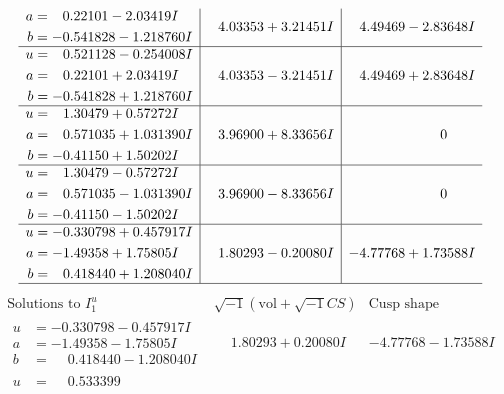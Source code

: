 \documentclass[1p]{elsarticle_modified}
\theoremstyle{definition}
\newcommand{\I}{\sqrt{-1}}
\begin{document}
$$\begin{array}{c|c|c}
\begin{aligned}
a &= \phantom{-}0.22101 - 2.03419 I \\
b &= -0.541828 - 1.218760 I\end{aligned}
 & \phantom{-}4.03353 + 3.21451 I & \phantom{-}4.49469 - 2.83648 I \\ \hline\begin{aligned}
u &= \phantom{-}0.521128 - 0.254008 I \\
a &= \phantom{-}0.22101 + 2.03419 I \\
b &= -0.541828 + 1.218760 I\end{aligned}
 & \phantom{-}4.03353 - 3.21451 I & \phantom{-}4.49469 + 2.83648 I \\ \hline\begin{aligned}
u &= \phantom{-}1.30479 + 0.57272 I \\
a &= \phantom{-}0.571035 + 1.031390 I \\
b &= -0.41150 + 1.50202 I\end{aligned}
 & \phantom{-}3.96900 + 8.33656 I & \phantom{-0.000000 } 0 \\ \hline\begin{aligned}
u &= \phantom{-}1.30479 - 0.57272 I \\
a &= \phantom{-}0.571035 - 1.031390 I \\
b &= -0.41150 - 1.50202 I\end{aligned}
 & \phantom{-}3.96900 - 8.33656 I & \phantom{-0.000000 } 0 \\ \hline\begin{aligned}
u &= -0.330798 + 0.457917 I \\
a &= -1.49358 + 1.75805 I \\
b &= \phantom{-}0.418440 + 1.208040 I\end{aligned}
 & \phantom{-}1.80293 - 0.20080 I & -4.77768 + 1.73588 I\\
 \hline 
 \end{array}$$\newpage$$\begin{array}{c|c|c}  
\text{Solutions to }I^u_{1}& \I (\text{vol} + \sqrt{-1}CS) & \text{Cusp shape}\\
 \hline 
\begin{aligned}
u &= -0.330798 - 0.457917 I \\
a &= -1.49358 - 1.75805 I \\
b &= \phantom{-}0.418440 - 1.208040 I\end{aligned}
 & \phantom{-}1.80293 + 0.20080 I & -4.77768 - 1.73588 I \\ \hline\begin{aligned}
u &= \phantom{-}0.533399\phantom{ +0.000000I} \\

\end{aligned}
\end{array}$$
\end{document}
